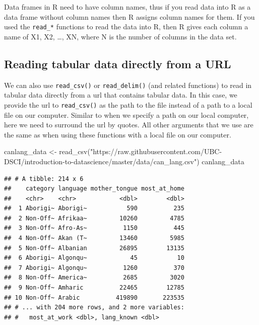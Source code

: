 \documentclass[
]{krantz}
\makeatletter
\newenvironment{Shaded}{\begin{snugshade}}{\end{snugshade}}
\newcommand{\FunctionTok}[1]{\textcolor[rgb]{0,0,0}{#1}}
\newcommand{\NormalTok}[1]{#1}
\newcommand{\OtherTok}[1]{\textcolor[rgb]{0.37,0.37,0.37}{#1}}
\newcommand{\StringTok}[1]{\textcolor[rgb]{0.5,0.5,0.5}{#1}}
\newenvironment{kframe}{%
\medskip{}
\setlength{\fboxsep}{.8em}
 \def\at@end@of@kframe{}%
 \ifinner\ifhmode%
  \def\at@end@of@kframe{\end{minipage}}%
  \begin{minipage}{\columnwidth}%
 \fi\fi%
 \def\FrameCommand##1{\hskip\@totalleftmargin \hskip-\fboxsep
 \colorbox{shadecolor}{##1}\hskip-\fboxsep
     \hskip-\linewidth \hskip-\@totalleftmargin \hskip\columnwidth}%
 \MakeFramed {\advance\hsize-\width
   \@totalleftmargin\z@ \linewidth\hsize
   \@setminipage}}%
 {\par\unskip\endMakeFramed%
 \at@end@of@kframe}
\renewenvironment{Shaded}{\begin{kframe}}{\end{kframe}}
\makeatother
\begin{document}
Data frames in R need to have column names, thus if you read data into R as a data frame without column names then R assigns column names for them. If you used the \texttt{read\_*} functions to read the data into R, then R gives each column a name of X1, X2, \ldots, XN, where N is the number of columns in the data set.

\hypertarget{reading-tabular-data-directly-from-a-url}{%
\subsection{Reading tabular data directly from a URL}\label{reading-tabular-data-directly-from-a-url}}

We can also use \texttt{read\_csv()} or \texttt{read\_delim()} (and related functions) to read in tabular data directly from a url that contains tabular data. In this case, we provide the url to \texttt{read\_csv()} as the path to the file instead of a path to a local file on our computer. Similar to when we specify a path on our local computer, here we need to surround the url by quotes. All other arguments that we use are the same as when using these functions with a local file on our computer.

\begin{Shaded}
\begin{Highlighting}[]
\NormalTok{canlang\_data }\OtherTok{\textless{}{-}} \FunctionTok{read\_csv}\NormalTok{(}\StringTok{"https://raw.githubusercontent.com/UBC{-}DSCI/introduction{-}to{-}datascience/master/data/can\_lang.csv"}\NormalTok{)}
\NormalTok{canlang\_data}
\end{Highlighting}
\end{Shaded}

\begin{verbatim}
## # A tibble: 214 x 6
##    category language mother_tongue most_at_home
##    <chr>    <chr>            <dbl>        <dbl>
##  1 Aborigi~ Aborigi~           590          235
##  2 Non-Off~ Afrikaa~         10260         4785
##  3 Non-Off~ Afro-As~          1150          445
##  4 Non-Off~ Akan (T~         13460         5985
##  5 Non-Off~ Albanian         26895        13135
##  6 Aborigi~ Algonqu~            45           10
##  7 Aborigi~ Algonqu~          1260          370
##  8 Non-Off~ America~          2685         3020
##  9 Non-Off~ Amharic          22465        12785
## 10 Non-Off~ Arabic          419890       223535
## # ... with 204 more rows, and 2 more variables:
## #   most_at_work <dbl>, lang_known <dbl>
\end{verbatim}
\end{document}
